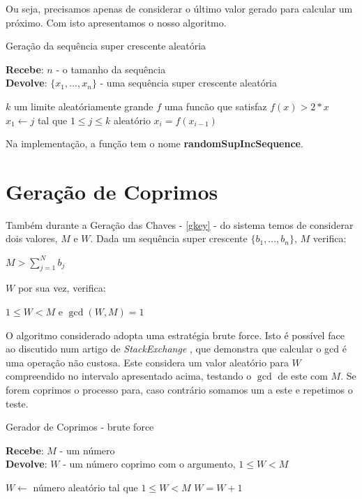 \documentclass[11pt, language=portuguese]{report}
\begin{document}
Ou seja, precisamos apenas de considerar o último valor gerado para calcular um próximo.
Com isto apresentamos o nosso algoritmo.
\begin{algorithm}[H]
	\caption{Geração da sequência super crescente aleatória}
	\textbf{Recebe}: $n$ - o tamanho da sequência\\
	\textbf{Devolve}: $\{x_1, ..., x_n\}$ - uma sequência super crescente aleatória
	\begin{algorithmic}[1]
		\State $k$ um limite aleatóriamente grande
		\State $f$ uma funcão que satisfaz $f(x) > 2 * x$
		\State $x_1 \gets j$ tal que $1 \le j \le k$ aleatório
			\State $x_i = f(x_{i-1})$
		\EndFor
	\end{algorithmic}
\end{algorithm}

Na implementação, a função tem o nome \textbf{randomSupIncSequence}.

\section{Geração de Coprimos}
\label{coprimos}

Também durante a Geração das Chaves - \ref{gkey} - do sistema temos de considerar dois valores, $M$ e $W$.
Dada um sequência super crescente $\{b_1, ..., b_n\}$, $M$ verifica:
\begin{center}
	$M > \sum_{j = 1}^{N} b_j$
\end{center}

$W$ por sua vez, verifica:
\begin{center}
        $1 \leq W < M$ e $ \gcd(W,M) = 1 $
\end{center}

O algoritmo considerado adopta uma estratégia brute force. Isto é possível face ao discutido num artigo de \textit{StackExchange} \autocite{stackex}, que demonstra que calcular o gcd é uma operação não custosa. Este considera um valor aleatório para $W$ compreendido no intervalo apresentado acima, testando o $\gcd$ de este com $M$. Se forem coprimos o processo para, caso contrário somamos um a este e repetimos o teste.

\begin{algorithm}[H]
	\caption{Gerador de Coprimos - brute force}
	\textbf{Recebe}: $M$ - um número\\
	\textbf{Devolve}: $W$ - um número coprimo com o argumento, $1 \le W < M$
	\begin{algorithmic}[1]
		\State $W \gets$ número aleatório tal que $1 \le W < M$
			\State $W = W + 1$
		\EndWhile
	\end{algorithmic}
\end{algorithm}
\end{document}
